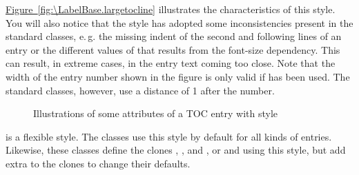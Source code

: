 \begin{description}
  \hyperref[fig:\LabelBase.largetocline]%
  {Figure~\ref*{fig:\LabelBase.largetocline}} illustrates the characteristics of
  this style. You will also notice that the style has adopted some
  inconsistencies present in the standard classes, e.\,g. the missing indent
  of the second and following lines of an entry or the different values of
   that results from the font-size dependency. This can
  result, in extreme cases, in the entry text coming too close. Note that the
  width of the entry number shown in the figure is only valid if
   has been used. The standard classes,
  however, use a distance of 1 after the number.
  \begin{figure}
    \centering
    \caption{Illustrations of some attributes of a TOC entry with style
      }
  \end{figure}
\item[\PValue{tocline}] is a flexible style. The \KOMAScript{} classes use
  this style by default for all kinds of entries. Likewise, these classes
  define the clones , , and , or
   and  using this style, but add extra
   to the clones to change their defaults.


\end{description}
